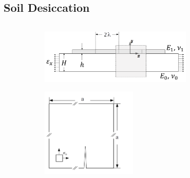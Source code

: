 \subsection{Soil Desiccation}

\subsectioncover

\begin{frame}{}
\vspace{-1.5em}
\begin{columns}
    \begin{column}{0.3\textwidth}
        \vspace{-1em}
        \begin{figure}[htb!]
            \centering
            \begin{subfigure}[b]{\textwidth}
                \centering
                \includegraphics[width=0.8\textwidth]{past/figures/1D_schematic.png}
                \caption{}
            \end{subfigure}

            \begin{subfigure}[b]{\textwidth}
                \centering
                \includegraphics[width=0.5\textwidth]{past/figures/2D_schematic.png}
                \caption{}
            \end{subfigure}


\end{figure}
\end{column}
\end{columns}
\end{frame}

